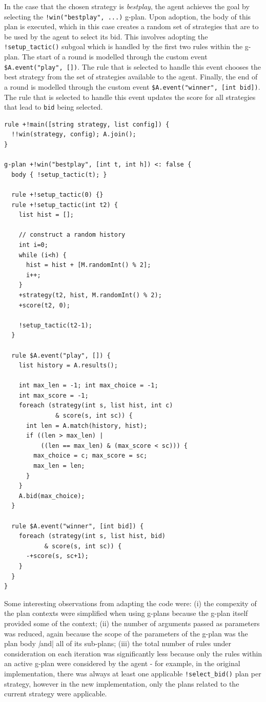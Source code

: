 In the case that the chosen strategy is \emph{bestplay}, the agent achieves the goal by selecting 
the \verb|!win("bestplay", ...)| g-plan. Upon adoption, the body of this plan is executed, which 
in this case creates a random set of strategies that are to be used by the agent to select its 
bid. This involves adopting the \verb|!setup_tactic()| subgoal which is handled by the first two 
rules within the g-plan. The start of a round is modelled through the custom event 
\verb|$A.event("play", [])|. The rule that is selected to handle this event chooses the best 
strategy from the set of strategies available to the agent. Finally, the end of a round is modelled 
through the custom event \verb|$A.event("winner", [int bid])|. The rule that is selected to handle 
this event updates the score for all strategies that lead to \verb|bid| being selected.

{\small
\begin{verbatim}
rule +!main([string strategy, list config]) {
  !!win(strategy, config); A.join();
}

g-plan +!win("bestplay", [int t, int h]) <: false {
  body { !setup_tactic(t); }

  rule +!setup_tactic(0) {}
  rule +!setup_tactic(int t2) {
    list hist = [];
			
    // construct a random history
    int i=0;
    while (i<h) {
      hist = hist + [M.randomInt() % 2];
      i++;
    }
    +strategy(t2, hist, M.randomInt() % 2);
    +score(t2, 0);
		
    !setup_tactic(t2-1);
  }
		
  rule $A.event("play", []) { 
    list history = A.results();
			
    int max_len = -1; int max_choice = -1;
    int max_score = -1;
    foreach (strategy(int s, list hist, int c) 
              & score(s, int sc)) {
      int len = A.match(history, hist);
      if ((len > max_len) | 
          ((len == max_len) & (max_score < sc))) {
        max_choice = c; max_score = sc;
        max_len = len;
      }
    }
    A.bid(max_choice);
  }

  rule $A.event("winner", [int bid]) {
    foreach (strategy(int s, list hist, bid) 
           & score(s, int sc)) {
      -+score(s, sc+1);
    }
  }
}
\end{verbatim}}

Some interesting observations from adapting the code were: (i) the compexity of the plan contexts 
were simplified when using g-plans because the g-plan itself provided some of the context; (ii) 
the number of arguments passed as parameters was reduced, again because the scope of the parameters 
of the g-plan was the plan body \emph|and| all of its sub-plans; (iii) the total number of rules 
under consideration on each iteration was significantly less because only the rules within an 
active g-plan were considered by the agent - for example, in the original implementation, there 
was always at least one applicable \verb|!select_bid()| plan per strategy, however in the new 
implementation, only the plans related to the current strategy were applicable.

